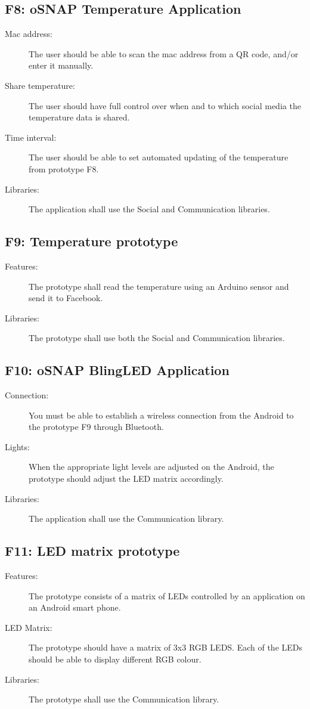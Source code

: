 \subsection{F8: oSNAP Temperature Application}
\begin{description}
	\item[Mac address:] The user should be able to scan the mac address from a QR code, and/or enter it manually. 
	\item[Share temperature:] The user should have full control over when and to which social media the temperature data is shared.
	\item[Time interval:] The user should be able to set automated updating of the temperature from prototype F8.
	\item[Libraries:] The application shall use the Social and Communication libraries.
\end{description}

\subsection{F9: Temperature prototype}
\begin{description}
	\item[Features:] The prototype shall read the temperature using an Arduino
	sensor and send it to Facebook.
	\item[Libraries:] The prototype shall use both the Social and Communication
	libraries.
\end{description}

\subsection{F10: oSNAP BlingLED Application}
\begin{description}
	\item[Connection:] You must be able to establish a wireless connection from the Android to the prototype F9 through Bluetooth.
	\item[Lights:] When the appropriate light levels are adjusted on the Android, the prototype should adjust the LED matrix accordingly.
	\item[Libraries:] The application shall use the Communication library.
\end{description}

\subsection{F11: LED matrix prototype}
\begin{description}
	\item[Features:] The prototype consists of a matrix of LEDs controlled by an application on 
	an Android smart phone.
	\item[LED Matrix:] The prototype should have a matrix of 3x3 RGB LEDS. Each of the LEDs should be able to display different RGB colour.
	\item[Libraries:] The prototype shall use the Communication library.
\end{description}

